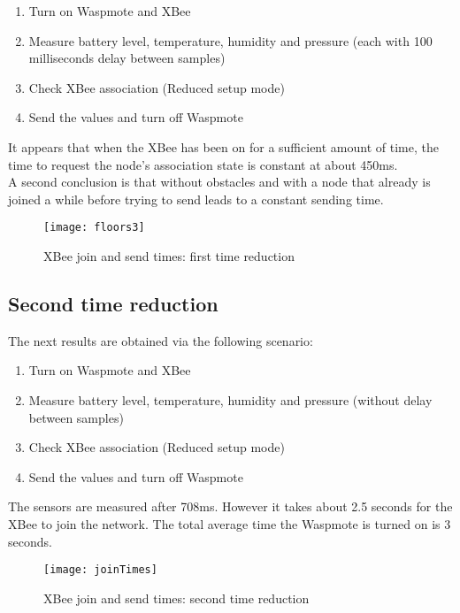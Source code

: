 \begin{enumerate}
\item Turn on Waspmote and XBee
\item Measure battery level, temperature, humidity and pressure (each with 100 milliseconds delay between samples)
\item Check XBee association (Reduced setup mode)
\item Send the values and turn off Waspmote
\end{enumerate}
\vspace{1cm}
\noindent
It appears that when the XBee has been on for a sufficient amount of time, the time to request the node's association state is constant at about 450ms.\\
A second conclusion is that without obstacles and with a node that already is joined a while before trying to send leads to a constant sending time.\\  \bigskip \bigskip
\hspace{5cm}
\begin{figure}[htbp]
\centering
\texttt{[image: floors3]}
\caption[XBee join and send times: first time reduction]{XBee join and send times: first time reduction}
\label{fig:floors3}
\end{figure}
\vfill
\pagebreak
\subsection{Second time reduction}
\label{second}
The next results are obtained via the following scenario:\\

\begin{enumerate}
\item Turn on Waspmote and XBee
\item Measure battery level, temperature, humidity and pressure (without delay between samples)
\item Check XBee association (Reduced setup mode)
\item Send the values and turn off Waspmote
\end{enumerate}
\vspace{1cm}
\noindent
The sensors are measured after 708ms. However it takes about 2.5 seconds for the XBee to join the network. The total average time the Waspmote is turned on is 3 seconds.
\begin{figure}[htbp]
\centering
\texttt{[image: joinTimes]}
\caption[XBee join and send times: second time reduction]{XBee join and send times: second time reduction}
\label{fig:joinTimes}
\end{figure} 
\vfill
\pagebreak
